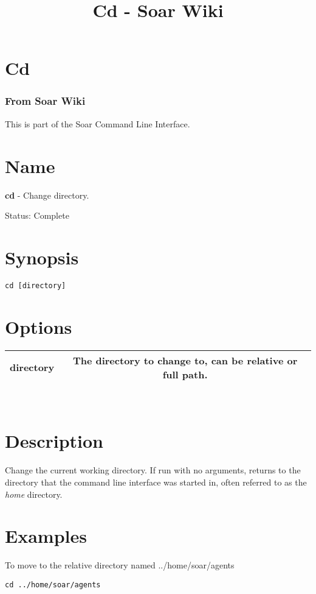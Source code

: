 \documentclass[10pt]{article}
\title{Cd - Soar Wiki}
\begin{document}
\section*{Cd}
\subsubsection*{From Soar Wiki}


 This is part of the Soar Command Line Interface. 
\section*{ Name }


 \textbf{cd}
 - Change directory. 


 Status: Complete
\section*{ Synopsis }
\begin{verbatim}
cd [directory]

\end{verbatim}
\section*{ Options }


\begin{tabular}{|c|c|}
\hline 
 directory  & The directory to change to, can be relative or full path.  \\
 \hline 

\end{tabular}



 \\ 

\section*{ Description }


 Change the current working directory. If run with no arguments, returns to the directory that the command line interface was started in, often referred to as the \emph{home}
 directory. 
\section*{ Examples }


 To move to the relative directory named ../home/soar/agents \begin{verbatim}
cd ../home/soar/agents


\end{verbatim}
\end{document}
